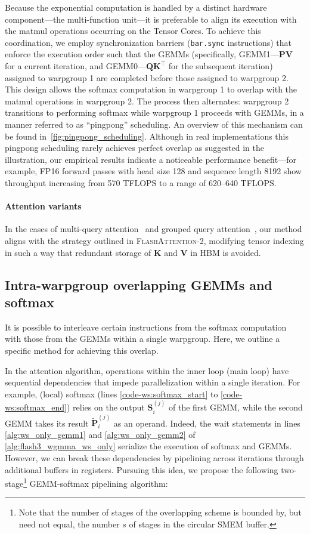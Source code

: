 Because the exponential computation is handled by a distinct hardware component—the multi-function unit—it is preferable to align its execution with the matmul operations occurring on the Tensor Cores. To achieve this coordination, we employ synchronization barriers (\texttt{bar.sync} instructions) that enforce the execution order such that the GEMMs (specifically, GEMM1—$\mathbf{P} \mathbf{V}$ for a current iteration, and GEMM0—$\mathbf{Q} \mathbf{K}^\top$ for the subsequent iteration) assigned to warpgroup 1 are completed before those assigned to warpgroup 2. This design allows the softmax computation in warpgroup 1 to overlap with the matmul operations in warpgroup 2. The process then alternates: warpgroup 2 transitions to performing softmax while warpgroup 1 proceeds with GEMMs, in a manner referred to as ``pingpong'' scheduling. An overview of this mechanism can be found in~\cref{fig:pingpong_scheduling}. Although in real implementations this pingpong scheduling rarely achieves perfect overlap as suggested in the illustration, our empirical results indicate a noticeable performance benefit—for example, FP16 forward passes with head size 128 and sequence length 8192 show throughput increasing from 570 TFLOPS to a range of 620–640 TFLOPS.

\paragraph{Attention variants} In the cases of multi-query attention~\citep{shazeer2019fast} and grouped query attention~\citep{ainslie2023gqa}, our method aligns with the strategy outlined in \textsc{FlashAttention-2}, modifying tensor indexing in such a way that redundant storage of $\mathbf{K}$ and $\mathbf{V}$ in HBM is avoided.

\subsection{Intra-warpgroup overlapping GEMMs and softmax}

It is possible to interleave certain instructions from the softmax computation with those from the GEMMs within a single warpgroup. Here, we outline a specific method for achieving this overlap.

In the attention algorithm, operations within the inner loop (main loop) have sequential dependencies that impede parallelization within a single iteration. For example, (local) softmax (lines \ref{code-ws:softmax_start} to \ref{code-ws:softmax_end}) relies on the output $\mathbf{S}_i^{(j)}$ of the first GEMM, while the second GEMM takes its result $\widetilde{\mathbf{P}}_i^{(j)}$ as an operand. Indeed, the wait statements in lines \ref{alg:ws_only_gemm1} and \ref{alg:ws_only_gemm2} of \cref{alg:flash3_wgmma_ws_only} serialize the execution of softmax and GEMMs. However, we can break these dependencies by pipelining across iterations through additional buffers in registers. Pursuing this idea, we propose the following two-stage\footnote{Note that the number of stages of the overlapping scheme is bounded by, but need not equal, the number $s$ of stages in the circular SMEM buffer.} GEMM-softmax pipelining algorithm:

